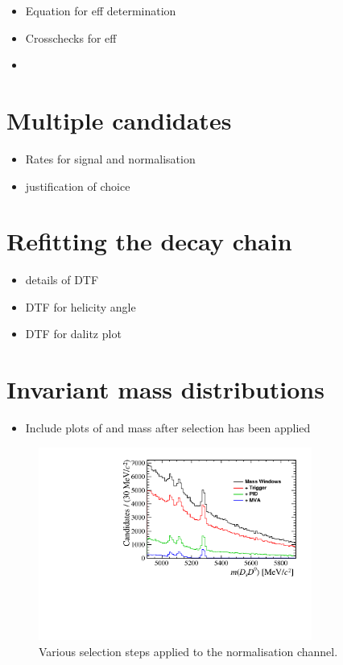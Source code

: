{\color{Red}
\begin{itemize}
\item Equation for eff determination
\item Crosschecks for eff
\item 
\end{itemize}
}

\section{Multiple candidates}



{\color{Red}
\begin{itemize}
\item Rates for signal and normalisation
\item justification of choice
\end{itemize}
}

\section{Refitting the decay chain}
{\color{Red}
\begin{itemize}
\item details of DTF
\item DTF for helicity angle
\item DTF for dalitz plot
\end{itemize}
}


\section{Invariant mass distributions}

{\color{Red}
\begin{itemize}
\item Include plots of \Ds and \Kp\Km mass after selection has been applied 
\end{itemize}
}

\begin{figure}[!h]
    \centering
        \includegraphics[width=0.8\textwidth]{figs/Selection/Normalisation_with_sel_B2DsD0.pdf}
    \caption{Various selection steps applied to the normalisation channel.}
    \label{fig:norm_selection}   
\end{figure}


